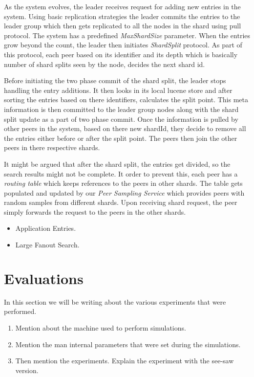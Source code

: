 \documentclass[a4paper, 11pt]{article}
\begin{document}
As the system evolves, the leader receives request for adding new entries in the system. Using basic replication strategies the leader commits the entries to the leader group which then gets replicated to all the nodes in the shard using pull protocol. The system has a predefined \textit{MaxShardSize} parameter. When the entries grow beyond the count, the leader then initiates \textit{ShardSplit} protocol. As part of this protocol, each peer based on its identifier and its depth which is basically number of shard splits seen by the node, decides the next shard id. 
\par Before initiating the two phase commit of the shard split, the leader stops handling the entry additions. It then looks in its local lucene store and after sorting the entries based on there identifiers, calculates the split point. This meta information is then committed to the leader group nodes along with the shard split update as a part of two phase commit. Once the information is pulled by other peers in the system, based on there new shardId, they decide to remove all the entries either before or after the split point. The peers then join the other peers in there respective shards. 
\par It might be argued that after the shard split, the entries get divided, so the search results might not be complete. It order to prevent this, each peer has a \textit{routing table} which keeps references to the peers in other shards. The table gets populated and updated by our \textit{Peer Sampling Service} which provides peers with random samples from different shards. Upon receiving shard request, the peer simply forwards the request to the peers in the other shards.

\begin{itemize}

\item Application Entries.
\item Large Fanout Search.

\end{itemize}


\newpage
\section{Evaluations}


In this section we will be writing about the various experiments that were performed.

\begin{enumerate}

\item Mention about the machine used to perform simulations.
\item Mention the man internal parameters that were set during the simulations.
\item Then mention the experiments. Explain the experiment with the see-saw version.


\end{enumerate}
\end{document}
